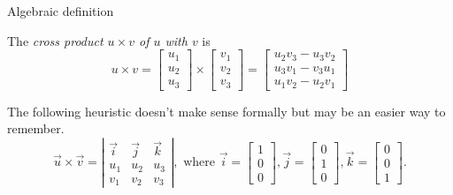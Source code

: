 \documentclass{beamer}
\begin{document}
\begin{frame}{Algebraic definition}
\begin{definition}
The \emph{cross product $u\times v$ of $u$ with $v$} is
\begin{equation*}
u\times v = \left[
\begin{array}{c}
u_1\\
u_2\\
u_3
\end{array}
\right]\times \left[
\begin{array}{c}
v_1\\
v_2\\
v_3
\end{array}
\right] = \left[
\begin{array}{c}
u_2v_3-u_3v_2\\
u_3v_1-v_3u_1\\
u_1v_2-u_2v_1
\end{array}
\right]
\end{equation*}
\end{definition}
The following heuristic doesn't make sense formally but may be an easier way to remember.
\begin{equation*}
	\vec{u}\times\vec{v} =
	\left|\begin{array}{ccc}
	\vec{i} & \vec{j} & \vec{k} \\
	u_1 & u_2 & u_3 \\
	v_1 & v_2  & v_3 
	\end{array}\right|,
	\mbox{ where }
	\vec{i} = 
	\left[\begin{array}{c}
	1 \\ 0 \\ 0 \end{array}\right],
	\vec{j} = 
	\left[\begin{array}{c}
	0 \\ 1 \\ 0 \end{array}\right],
	\vec{k} = 
	\left[\begin{array}{c}
	0 \\ 0 \\ 1 \end{array}\right].
\end{equation*}
\end{frame}
\end{document}
